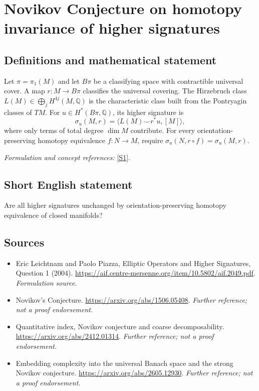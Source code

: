 \documentclass[11pt]{article}
\begin{document}
\section*{\texorpdfstring{Novikov Conjecture on homotopy invariance of higher signatures}{Novikov Conjecture on homotopy invariance of higher signatures}}\label{56}
\subsection{Definitions and mathematical statement}
Let $\pi=\pi_1(M)$ and let $B\pi$ be a classifying space with contractible universal cover. A map $r:M\to B\pi$ classifies the universal covering. The Hirzebruch class $L(M)\in\bigoplus_jH^{4j}(M,{\mathbb{Q}})$ is the characteristic class built from the Pontryagin classes of $TM$. For $u\in H^*(B\pi,{\mathbb{Q}})$, its higher signature is
\[
 \sigma_u(M,r)=\langle L(M)\smile r^*u,[M]\rangle,
\]
where only terms of total degree $\dim M$ contribute. For every orientation-preserving homotopy equivalence $f:N\to M$, require $\sigma_u(N,r\circ f)=\sigma_u(M,r)$.
\par\smallskip\textit{Formulation and concept references:} \href{https://aif.centre-mersenne.org/item/10.5802/aif.2049.pdf}{[S1]}.

\subsection{Short English statement}
Are all higher signatures unchanged by orientation-preserving homotopy equivalence of closed manifolds?
\subsection{Sources}
\begin{itemize}
\item[S1]Eric Leichtnam and Paolo Piazza, Elliptic Operators and Higher Signatures, Question 1 (2004).
\url{https://aif.centre-mersenne.org/item/10.5802/aif.2049.pdf}.
\textit{Formulation source.}
\item[S2]Novikov's Conjecture.
\url{https://arxiv.org/abs/1506.05408}.
\textit{Further reference; not a proof endorsement.}
\item[S3]Quantitative index, Novikov conjecture and coarse decomposability.
\url{https://arxiv.org/abs/2412.01314}.
\textit{Further reference; not a proof endorsement.}
\item[S4]Embedding complexity into the universal Banach space and the strong Novikov conjecture.
\url{https://arxiv.org/abs/2605.12930}.
\textit{Further reference; not a proof endorsement.}
\end{itemize}
\end{document}
